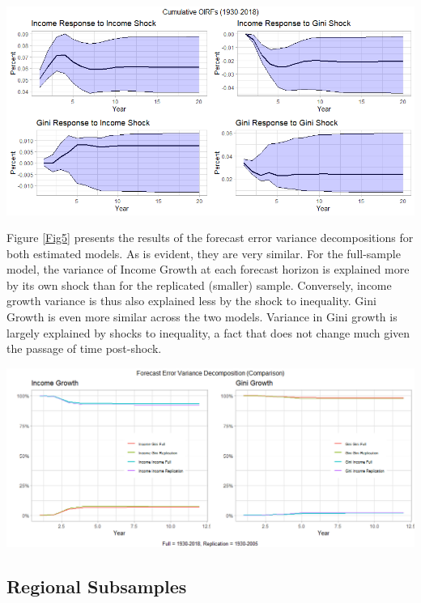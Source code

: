 \documentclass[11pt,preprint, authoryear]{elsarticle}
\let\origfigure\figure
\let\endorigfigure\endfigure
\renewenvironment{figure}[1][2] {
    \expandafter\origfigure\expandafter[H]
} {
    \endorigfigure
}
\numberwithin{equation}{section}
\numberwithin{figure}{section}
\numberwithin{table}{section}
\begin{document}
\begin{figure}[H]

{\centering \includegraphics[width=1\linewidth]{images/Fig4_baseline_full_COIRFs} 

}

\caption{\label{Fig4}}\label{fig:Fig4}
\end{figure}

Figure \ref{Fig5} presents the results of the forecast error variance
decompositions for both estimated models. As is evident, they are very
similar. For the full-sample model, the variance of Income Growth at
each forecast horizon is explained more by its own shock than for the
replicated (smaller) sample. Conversely, income growth variance is thus
also explained less by the shock to inequality. Gini Growth is even more
similar across the two models. Variance in Gini growth is largely
explained by shocks to inequality, a fact that does not change much
given the passage of time post-shock.

\begin{figure}[H]
\includegraphics[width=1\linewidth]{images/Fig5_fevd_all} \caption{\label{Fig5}}\label{fig:Fig5}
\end{figure}

\hypertarget{regional-subsamples}{%
\subsection{\texorpdfstring{Regional Subsamples
\label{Section 3.4}}{Regional Subsamples }}\label{regional-subsamples}}
\end{document}

